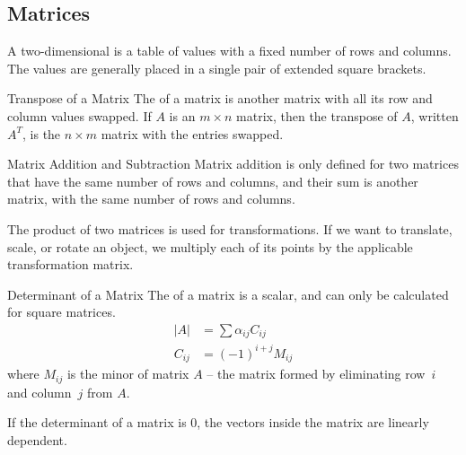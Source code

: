 \documentclass[../COS3712_Notes.tex]{subfiles}
\begin{document}
      \subsection{Matrices}
        A two-dimensional  is a table of values with a fixed number of rows
        and columns.
        The values are generally placed in a single pair of extended square brackets.

        \begin{definition}{Transpose of a Matrix}
          The  of a matrix is another matrix with all its row and column values
          swapped.
          If $A$ is an $m \times n$ matrix, then the transpose of $A$, written $A^T$,
          is the $n \times m$ matrix with the entries swapped.
        \end{definition}

        \begin{definition}{Matrix Addition and Subtraction}
          Matrix addition is only defined for two matrices that have the same number of rows
          and columns, and their sum is another matrix,
          with the same number of rows and columns.
        \end{definition}

        The product of two matrices is used for transformations.
        If we want to translate, scale, or rotate an object, we multiply each of its points
        by the applicable transformation matrix.

        \begin{definition}{Determinant of a Matrix}
          The  of a matrix is a scalar, and can only be calculated for
          square matrices.
          \begin{align*}
            \lvert A \rvert &= \sum \alpha_{ij} C_{ij}\\
            C_{ij} &= (-1)^{i + j} M_{ij}
          \end{align*}
          where $M_{ij}$ is the minor of matrix $A$ -- the matrix formed by eliminating
          row~$i$ and column~$j$ from $A$.
        \end{definition}

        If the determinant of a matrix is 0, the vectors inside the matrix are linearly dependent.
\end{document}
